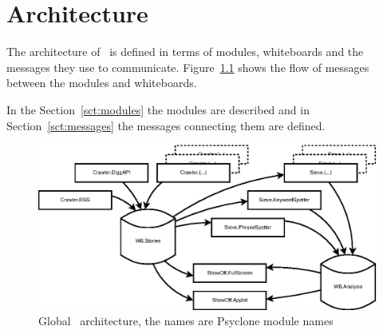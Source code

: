 \chapter{\label{cpt:architecture}Architecture}

The architecture of \Amber\ is defined in terms of modules, whiteboards and the
messages they use to communicate. Figure~\ref{fig:global-architecture} shows
the flow of messages between the modules and whiteboards.

In the Section~\ref{sct:modules} the modules are described and in
Section~\ref{sct:messages} the messages connecting them are defined. %

\begin{figure}
    \centering
    \includegraphics{image/global-architecture}
    \caption{\label{fig:global-architecture}Global \Amber\ architecture, the
              names are Psyclone module names}
\end{figure}





% 

